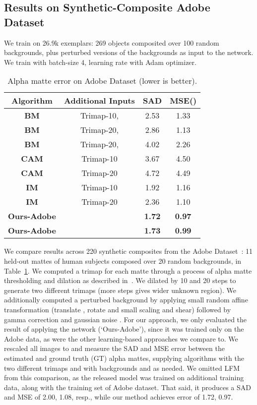 \documentclass[10pt,twocolumn,letterpaper]{article}
\begin{document}
\subsection{Results on Synthetic-Composite Adobe Dataset}
\label{sec:syn}
We train  on 26.9k exemplars: 269 objects composited over 100 random backgrounds, plus perturbed versions of the backgrounds as input to the network. We train with batch-size 4, learning rate  with Adam optimizer. 

\begin{table}
\vspace{-0.5em}
\setlength\tabcolsep{2pt}
	\centering
	\small
	\captionsetup{justification=centering}
\begin{tabular}{cccc}
			\toprule
			 Algorithm & Additional Inputs & SAD & MSE() \\ 
			\midrule
			\textbf{BM} & Trimap-10,  & 2.53& 1.33\\
			\textbf{BM} & Trimap-20,  & 2.86& 1.13\\
			\textbf{BM} & Trimap-20,  & 4.02& 2.26\\
			\midrule
			\textbf{CAM} & Trimap-10 & 3.67& 4.50\\
			\textbf{CAM} & Trimap-20 & 4.72& 4.49\\
			\midrule
			\textbf{IM} & Trimap-10 & 1.92& 1.16\\
			\textbf{IM} & Trimap-20 & 2.36& 1.10\\
			\midrule
\textbf{Ours-Adobe} &  & \textbf{1.72}& \textbf{0.97}\\
			\textbf{Ours-Adobe} &  & \textbf{1.73}& \textbf{0.99}\\
			\bottomrule
		\end{tabular}
		\caption{\small Alpha matte error on Adobe Dataset (lower is better).}
	\vspace{-1.5em}
	\label{tab:adobe}
\end{table}

We compare results across 220 synthetic composites from the Adobe Dataset~\cite{xu2017deep}: 11 held-out mattes of human subjects composed over 20 random backgrounds, in Table~\ref{tab:adobe}. We computed a trimap for each matte through a process of alpha matte thresholding and dilation as described in~\cite{xu2017deep}. We dilated by 10 and 20 steps to generate two different trimaps (more steps gives wider unknown region).  We additionally computed a perturbed background  by applying small random affine transformation (translate , rotate  and small scaling and shear) followed by gamma correction  and gaussian noise .  For our approach, we only evaluated the result of applying the  network (`Ours-Adobe'), since it was trained only on the Adobe data, as were the other learning-based approaches we compare to. We rescaled all images to  and measure the SAD and MSE error between the estimated and ground truth (GT) alpha mattes, supplying algorithms with the two different trimaps and with backgrounds  and  as needed.  We omitted LFM from this comparison, as the released model was trained on additional training data, along with the training set of Adobe dataset. That said, it produces a SAD and MSE of 2.00, 1.08, resp., while our method achieves error of 1.72, 0.97.
\end{document}

